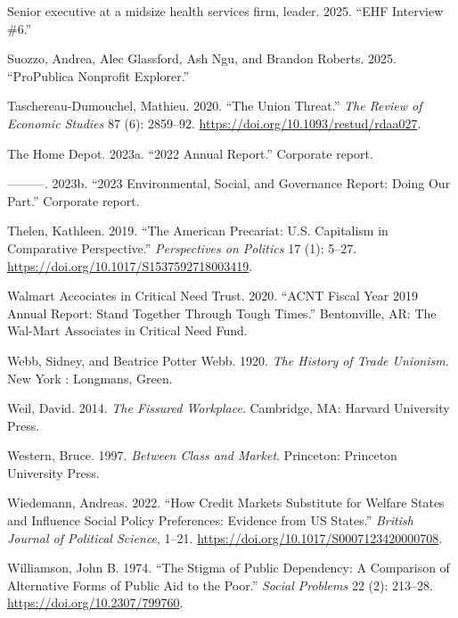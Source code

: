 \documentclass[
  11pt,
  oneside]{article}
\newlength{\cslhangindent}
\newenvironment{CSLReferences}[2] %
 {\begin{list}{}{%
  \setlength{\itemindent}{0pt}
  \setlength{\leftmargin}{0pt}
  \setlength{\parsep}{0pt}
  \ifodd #1
   \setlength{\leftmargin}{\cslhangindent}
   \setlength{\itemindent}{-1\cslhangindent}
  \fi
  \setlength{\itemsep}{#2\baselineskip}}}
 {\end{list}}
\begin{document}
\begin{CSLReferences}{1}{0}
Senior executive at a midsize health services firm, leader. 2025. {``{EHF} Interview \#6.''}

Suozzo, Andrea, Alec Glassford, Ash Ngu, and Brandon Roberts. 2025. {``{ProPublica Nonprofit Explorer}.''}

Taschereau-Dumouchel, Mathieu. 2020. {``The {Union Threat}.''} \emph{The Review of Economic Studies} 87 (6): 2859--92. \url{https://doi.org/10.1093/restud/rdaa027}.

The Home Depot. 2023a. {``2022 Annual Report.''} Corporate report.

---------. 2023b. {``2023 Environmental, Social, and Governance Report: Doing Our Part.''} Corporate report.

Thelen, Kathleen. 2019. {``The {American} {Precariat}: {U}.{S}. {Capitalism} in {Comparative} {Perspective}.''} \emph{Perspectives on Politics} 17 (1): 5--27. \url{https://doi.org/10.1017/S1537592718003419}.

Walmart Accociates in Critical Need Trust. 2020. {``{ACNT Fiscal Year} 2019 {Annual Report}: {Stand} Together Through Tough Times.''} Bentonville, AR: The Wal-Mart Associates in Critical Need Fund.

Webb, Sidney, and Beatrice Potter Webb. 1920. \emph{The History of Trade Unionism}. New York : Longmans, Green.

Weil, David. 2014. \emph{The {Fissured} {Workplace}}. Cambridge, MA: Harvard University Press.

Western, Bruce. 1997. \emph{Between Class and Market}. Princeton: Princeton University Press.

Wiedemann, Andreas. 2022. {``How {Credit} {Markets} {Substitute} for {Welfare} {States} and {Influence} {Social} {Policy} {Preferences}: {Evidence} from {US} {States}.''} \emph{British Journal of Political Science}, 1--21. \url{https://doi.org/10.1017/S0007123420000708}.

Williamson, John B. 1974. {``The {Stigma} of {Public} {Dependency}: {A} {Comparison} of {Alternative} {Forms} of {Public} {Aid} to the {Poor}.''} \emph{Social Problems} 22 (2): 213--28. \url{https://doi.org/10.2307/799760}.


\end{CSLReferences}
\end{document}
